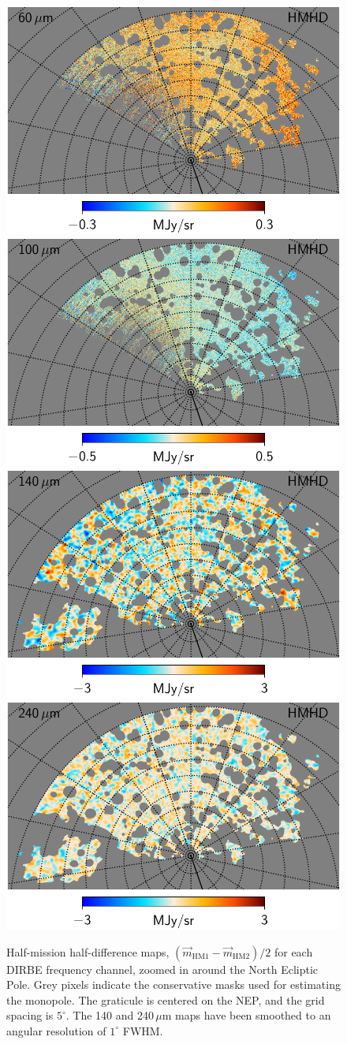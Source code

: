 \documentclass{aa}
\newcommand{\m}[0]{\vec{m}}
\begin{document}
\begin{figure}
  \includegraphics[width=0.38\linewidth]{figs/CGDR2_07_hmhd_fullres.pdf}\hspace*{5mm}
  \includegraphics[width=0.38\linewidth]{figs/CGDR2_08_hmhd_fullres.pdf}\\
  \includegraphics[width=0.38\linewidth]{figs/CGDR2_09_hmhd_fullres_1deg.pdf}\hspace*{5mm}
  \includegraphics[width=0.38\linewidth]{figs/CGDR2_10_hmhd_fullres_1deg.pdf}
  \caption{Half-mission half-difference maps, $(\m_{\mathrm{HM1}}-\m_{\mathrm{HM2}})/2$ for each DIRBE frequency channel, zoomed in around the North Ecliptic Pole. Grey pixels indicate the conservative masks used for estimating the monopole. The graticule is centered on the NEP, and the grid spacing is $5^{\circ}$. The 140 and 240\,$\mu\mathrm{m}$ maps have been smoothed to an angular resolution of $1^{\circ}$ FWHM.}
  \label{fig:hmhd_zoom}
\end{figure}
\end{document}
